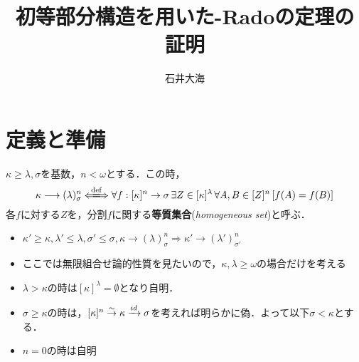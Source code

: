 \documentclass[a4paper]{bxjsarticle}
\title{初等部分構造を用いた\Erdos-Radoの定理の証明}
\author{石井大海}
\begin{document}
\maketitle

\section{定義と準備}
\begin{definition}
 $\kappa \geq \lambda, \sigma$を基数，$n<\omega$とする．この時，
 \[
 \kappa \longrightarrow (\lambda)^n_\sigma
 \defs \forall f: [\kappa]^n \to \sigma\, \exists Z \in [\kappa]^\lambda\, \forall A, B \in [Z]^n \left[ f(A) = f(B)\right]
 \]
 各$f$に対する$Z$を，分割$f$に関する{\bfseries 等質集合}({\itshape homogeneous set})と呼ぶ．
\end{definition}

\begin{rem*}
 \begin{itemize}
  \item $\kappa' \geq \kappa, \lambda' \leq \lambda, \sigma' \leq \sigma, \kappa \longrightarrow (\lambda)^n_\sigma
	\Longrightarrow \kappa' \longrightarrow (\lambda')^n_{\sigma'}$
  \item ここでは無限組合せ論的性質を見たいので，$\kappa, \lambda \geq \omega$の場合だけを考える
  \item $\lambda > \kappa$の時は$[\kappa]^\lambda = \emptyset$となり自明．
  \item $\sigma \geq \kappa$の時は，$[\kappa]^n \stackrel{\sim}{\to} \kappa \xrightarrow[]{id} \sigma$を考えれば明らかに偽．よって以下$\sigma < \kappa$とする．
  \item $n = 0$の時は自明
 \end{itemize}
\end{rem*}
\end{document}
